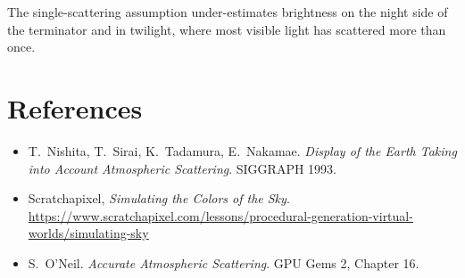 \documentclass[11pt]{article}
\begin{document}
The single-scattering assumption under-estimates brightness on the night side
of the terminator and in twilight, where most visible light has scattered more
than once.

\section*{References}
\begin{itemize}
  \item T.~Nishita, T.~Sirai, K.~Tadamura, E.~Nakamae.
        \emph{Display of the Earth Taking into Account Atmospheric Scattering}.
        SIGGRAPH 1993.
  \item Scratchapixel, \emph{Simulating the Colors of the Sky}.
        \url{https://www.scratchapixel.com/lessons/procedural-generation-virtual-worlds/simulating-sky}
  \item S.~O'Neil. \emph{Accurate Atmospheric Scattering}. GPU Gems 2, Chapter 16.
\end{itemize}
\end{document}
